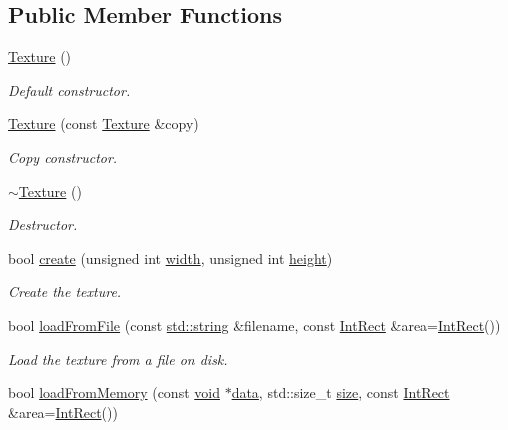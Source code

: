 \subsection*{Public Member Functions}
\begin{DoxyCompactItemize}
\item 
\hyperlink{classsf_1_1_texture_a3e04674853b8533bf981db3173e3a4a7}{Texture} ()
\begin{DoxyCompactList}\small\item\em Default constructor. \end{DoxyCompactList}\item 
\hyperlink{classsf_1_1_texture_a524855cbf89de3b74be84d385fd229de}{Texture} (const \hyperlink{classsf_1_1_texture}{Texture} \&copy)
\begin{DoxyCompactList}\small\item\em Copy constructor. \end{DoxyCompactList}\item 
\hyperlink{classsf_1_1_texture_a9c5354ad40eb1c5aeeeb21f57ccd7e6c}{$\sim$\-Texture} ()
\begin{DoxyCompactList}\small\item\em Destructor. \end{DoxyCompactList}\item 
bool \hyperlink{classsf_1_1_texture_a89b4c7d204acf1033c3a1b6e0a3ad0a3}{create} (unsigned int \hyperlink{gl3_8h_a9d14ddc31c6c8b61f3fe3679ab976133}{width}, unsigned int \hyperlink{gl3_8h_a67001679ebf2bb0ba972db4d29c6550c}{height})
\begin{DoxyCompactList}\small\item\em Create the texture. \end{DoxyCompactList}\item 
bool \hyperlink{classsf_1_1_texture_a8e1b56eabfe33e2e0e1cb03712c7fcc7}{load\-From\-File} (const \hyperlink{gl3_8h_ac83513893df92266f79a515488701770}{std\-::string} \&filename, const \hyperlink{namespacesf_aae67411782674934f78d55fa3af18403}{Int\-Rect} \&area=\hyperlink{namespacesf_aae67411782674934f78d55fa3af18403}{Int\-Rect}())
\begin{DoxyCompactList}\small\item\em Load the texture from a file on disk. \end{DoxyCompactList}\item 
bool \hyperlink{classsf_1_1_texture_a2c4adb19dd4cbee0a588eeb85e52a249}{load\-From\-Memory} (const \hyperlink{glutf90_8h_ac778d6f63f1aaf8ebda0ce6ac821b56e}{void} $\ast$\hyperlink{gl3_8h_a0f78eecb0891cce3bdfc815b971866a1}{data}, std\-::size\-\_\-t \hyperlink{gl3_8h_a79ef9eb3e59c4bb34c4b9fbeb8d28ff7}{size}, const \hyperlink{namespacesf_aae67411782674934f78d55fa3af18403}{Int\-Rect} \&area=\hyperlink{namespacesf_aae67411782674934f78d55fa3af18403}{Int\-Rect}())

\end{DoxyCompactItemize}
